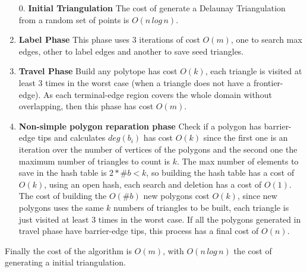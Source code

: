 \documentclass[pdflatex,sn-mathphys]{sn-jnl}%
\theoremstyle{thmstyleone}%
\theoremstyle{thmstyletwo}%
\theoremstyle{thmstylethree}%
\begin{document}
\begin{enumerate}
    \item[0.] \textbf{Initial Triangulation} The cost of generate a Delaunay Triangulation from a random set of points is $O(n\, log\, n)$.
    \item \textbf{Label Phase} This phase uses 3 iterations of cost $O(m)$, one to search max edges, other to label edges and another to save seed triangles.
    \item \textbf{Travel Phase} Build any polytope has cost $O(k)$, each triangle is visited at least 3 times in the worst case (when a triangle does not have a frontier-edge). As each terminal-edge region covers the whole domain without overlapping, then this phase has cost $O(m)$.
    \item \textbf{Non-simple polygon reparation phase} Check if a polygon has barrier-edge tips and calculates $deg(b_i)$ has cost $O(k)$ since the first one is an iteration over the number of vertices of the polygons and the second one the maximum number of triangles to count is $k$.  The max number of elements to save in the hash table is $2*\#b < k$, so building the hash table has a cost of $O(k)$, using an open hash, each search and deletion has a cost of $O(1)$. The cost of building the $O(\#b)$  new polygons cost $O(k)$, since new polygons uses the same $k$ numbers of triangles to be built, each triangle is just visited at least 3 times in the worst case. If all the polygons generated in travel phase have barrier-edge tips, this process has a final cost of $O(n)$.

\end{enumerate}

Finally the cost of the algorithm is $O(m)$, with $O(n\,log\,n)$ the cost of generating a initial triangulation.
    



\end{document}
